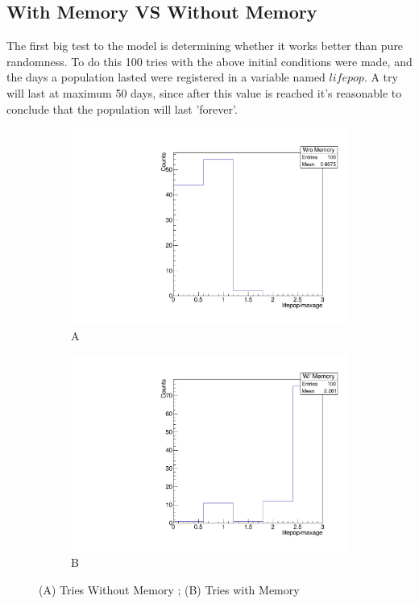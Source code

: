 \documentclass[a4paper,prd,twocolumn,nofootinbib,superscriptaddress,floatfix]{revtex4}
\begin{document}
\subsection{With Memory VS Without Memory}
 
 The first big test to the model is determining whether it works better than pure randomness. To do this 100 tries with the above initial conditions were made, and the days a population lasted were registered in a variable named $lifepop$. A try will last at maximum 50 days, since after this value is reached it's reasonable to conclude that the population will last 'forever'.
 
 \setcounter{figure}{3}
\begin{figure}[t] 
  \begin{subfigure}[b]{0.5\linewidth}
    \centering
    \includegraphics[width=1\linewidth]{smemoria.pdf} 
    \caption{A} 
    \label{fig:5a} 
    \vspace{4ex}
  \end{subfigure}%
  \begin{subfigure}[b]{0.5\linewidth}
    \centering
    \includegraphics[width=1\linewidth]{cmemoria.pdf} 
    \caption{B} 
    \label{fig:5b} 
    \vspace{4ex}
  \end{subfigure} 
  \caption{(A) Tries Without Memory ; (B) Tries with Memory}
  \label{fig:5} 
\end{figure}
\end{document}

